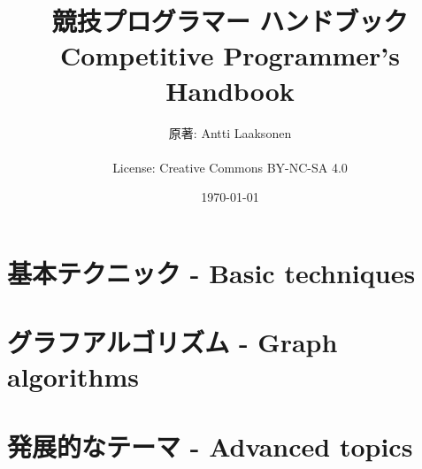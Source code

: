 \documentclass[twoside,12pt,a4paper]{ltjsbook}
\date{\today}
\title{\Huge 競技プログラマー ハンドブック \\ Competitive Programmer's Handbook}
\author{\Large 原著: Antti Laaksonen \\ \\ License: Creative Commons BY-NC-SA 4.0}
\begin{document}


\frontmatter
\maketitle
\setcounter{tocdepth}{1}
\tableofcontents



\mainmatter
{}
\setcounter{page}{1}

\newcommand{\key}[1] {\textbf{#1}}


\part{基本テクニック - Basic techniques}










\part{グラフアルゴリズム - Graph algorithms}










\part{発展的なテーマ - Advanced topics}











\cleardoublepage
{}
{}


\cleardoublepage
\printindex
\end{document}
